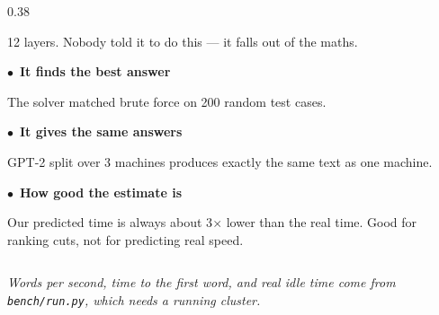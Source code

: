 \documentclass[aspectratio=169,11pt]{beamer}
\newcommand{\kefoot}[1]{%
  \vfill{\scriptsize\itshape\color{kemuted}#1}%
}
\newcommand{\kehead}[1]{{\bfseries\color{keink}#1}}
\begin{document}
\begin{frame}[shrink=20]
\begin{columns}[T]
\begin{column}{0.38\textwidth}
{\begin{minipage}{\dimexpr\textwidth-14pt\relax}
{       12 layers. Nobody told it to do this --- it falls out of the maths.}
      \vspace{0.3em}
    \end{minipage}}\par\vspace{0.5em}
    {\scriptsize
     \textcolor{keteal}{$\bullet$}\ \kehead{It finds the best answer}\par
     {\tiny\color{kebody}The solver matched brute force on 200 random test
      cases.}\par\vspace{0.4em}
     \textcolor{keteal}{$\bullet$}\ \kehead{It gives the same answers}\par
     {\tiny\color{kebody}GPT-2 split over 3 machines produces exactly the same
      text as one machine.}\par\vspace{0.4em}
     \textcolor{keteal}{$\bullet$}\ \kehead{How good the estimate is}\par
     {\tiny\color{kebody}Our predicted time is always about 3$\times$ lower than
      the real time. Good for ranking cuts, not for predicting real speed.}}
  \end{column}
  \end{columns}
  \kefoot{Words per second, time to the first word, and real idle time come
          from \texttt{bench/run.py}, which needs a running cluster.}
\end{frame}
\end{document}
